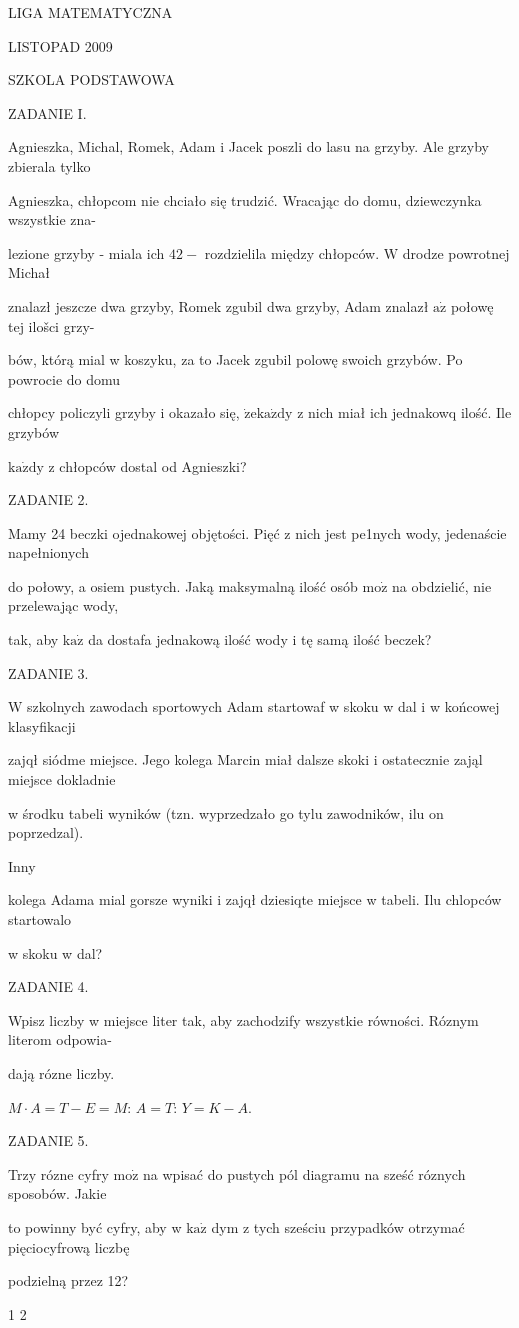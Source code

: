 \documentclass[a4paper,12pt]{article}
\begin{document}
LIGA MATEMATYCZNA

LISTOPAD 2009

SZKOLA PODSTAWOWA

ZADANIE I.

Agnieszka, Michal, Romek, Adam i Jacek poszli do lasu na grzyby. Ale grzyby zbierala tylko

Agnieszka, chłopcom nie chciało się trudzić. Wracając do domu, dziewczynka wszystkie zna-

lezione grzyby - miala ich $42 -$ rozdzielila między chłopców. $\mathrm{W}$ drodze powrotnej Michał

znalazł jeszcze dwa grzyby, Romek zgubil dwa grzyby, Adam znalazł $\mathrm{a}\dot{\mathrm{z}}$ połowę tej ilošci grzy-

bów, którą mial w koszyku, za to Jacek zgubil polowę swoich grzybów. Po powrocie do domu

chłopcy policzyli grzyby i okazało się, $\dot{\mathrm{z}}\mathrm{e}\mathrm{k}\mathrm{a}\dot{\mathrm{z}}\mathrm{d}\mathrm{y}$ z nich miał ich jednakowq ilość. Ile grzybów

$\mathrm{k}\mathrm{a}\dot{\mathrm{z}}\mathrm{d}\mathrm{y}$ z chłopców dostal od Agnieszki?

ZADANIE 2.

Mamy 24 beczki ojednakowej objętości. Pięć z nich jest pe1nych wody, jedenaście napełnionych

do połowy, a osiem pustych. Jaką maksymalną ilość osób $\mathrm{m}\mathrm{o}\dot{\mathrm{z}}$ na obdzielić, nie przelewając wody,

tak, aby $\mathrm{k}\mathrm{a}\dot{\mathrm{z}}$ da dostafa jednakową ilość wody i tę samą ilość beczek?

ZADANIE 3.

W szkolnych zawodach sportowych Adam startowaf w skoku w dal i w końcowej klasyfikacji

zajqł siódme miejsce. Jego kolega Marcin miał dalsze skoki i ostatecznie zająl miejsce dokladnie

w środku tabeli wyników (tzn. wyprzedzało go tylu zawodników, ilu on poprzedzal).

Inny

kolega Adama mial gorsze wyniki i zajqł dziesiqte miejsce w tabeli. Ilu chlopców startowalo

w skoku w dal?

ZADANIE 4.

Wpisz liczby w miejsce liter tak, aby zachodzify wszystkie równości. Róznym literom odpowia-

dają rózne liczby.

$M\cdot A=T-E=M$: $A=T$: $Y=K-A.$

ZADANIE 5.

Trzy rózne cyfry $\mathrm{m}\mathrm{o}\dot{\mathrm{z}}$ na wpisać do pustych pól diagramu na sześć róznych sposobów. Jakie

to powinny być cyfry, aby w $\mathrm{k}\mathrm{a}\dot{\mathrm{z}}$ dym z tych sześciu przypadków otrzymać pięciocyfrową liczbę

podzielną przez 12?

1 2
\end{document}
